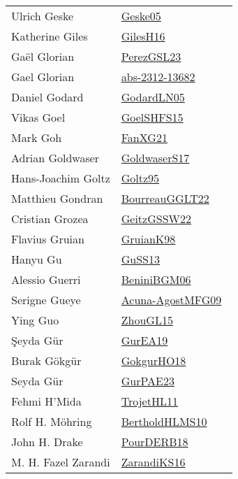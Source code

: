 {\begin{longtable}{p{4cm}p{20cm}}
Ulrich Geske & \href{works/Geske05.pdf}{Geske05}~\cite{Geske05}\\
Katherine Giles & \href{works/GilesH16.pdf}{GilesH16}~\cite{GilesH16}\\
Ga{\"{e}}l Glorian & \href{works/PerezGSL23.pdf}{PerezGSL23}~\cite{PerezGSL23}\\
Gael Glorian & \href{works/abs-2312-13682.pdf}{abs-2312-13682}~\cite{abs-2312-13682}\\
Daniel Godard & \href{works/GodardLN05.pdf}{GodardLN05}~\cite{GodardLN05}\\
Vikas Goel & \href{works/GoelSHFS15.pdf}{GoelSHFS15}~\cite{GoelSHFS15}\\
Mark Goh & \href{works/FanXG21.pdf}{FanXG21}~\cite{FanXG21}\\
Adrian Goldwaser & \href{works/GoldwaserS17.pdf}{GoldwaserS17}~\cite{GoldwaserS17}\\
Hans{-}Joachim Goltz & \href{works/Goltz95.pdf}{Goltz95}~\cite{Goltz95}\\
Matthieu Gondran & \href{works/BourreauGGLT22.pdf}{BourreauGGLT22}~\cite{BourreauGGLT22}\\
Cristian Grozea & \href{works/GeitzGSSW22.pdf}{GeitzGSSW22}~\cite{GeitzGSSW22}\\
Flavius Gruian & \href{works/GruianK98.pdf}{GruianK98}~\cite{GruianK98}\\
Hanyu Gu & \href{works/GuSS13.pdf}{GuSS13}~\cite{GuSS13}\\
Alessio Guerri & \href{works/BeniniBGM06.pdf}{BeniniBGM06}~\cite{BeniniBGM06}\\
Serigne Gueye & \href{works/Acuna-AgostMFG09.pdf}{Acuna-AgostMFG09}~\cite{Acuna-AgostMFG09}\\
Ying Guo & \href{works/ZhouGL15.pdf}{ZhouGL15}~\cite{ZhouGL15}\\
Şeyda G{\"u}r & \href{works/GurEA19.pdf}{GurEA19}~\cite{GurEA19}\\
Burak G{\"{o}}kg{\"{u}}r & \href{works/GokgurHO18.pdf}{GokgurHO18}~\cite{GokgurHO18}\\
Seyda G{\"{u}}r & \href{works/GurPAE23.pdf}{GurPAE23}~\cite{GurPAE23}\\
Fehmi H'Mida & \href{works/TrojetHL11.pdf}{TrojetHL11}~\cite{TrojetHL11}\\
Rolf H. M{\"{o}}hring & \href{works/BertholdHLMS10.pdf}{BertholdHLMS10}~\cite{BertholdHLMS10}\\
John H. Drake & \href{works/PourDERB18.pdf}{PourDERB18}~\cite{PourDERB18}\\
M. H. Fazel Zarandi & \href{works/ZarandiKS16.pdf}{ZarandiKS16}~\cite{ZarandiKS16}\\

\end{longtable}}
